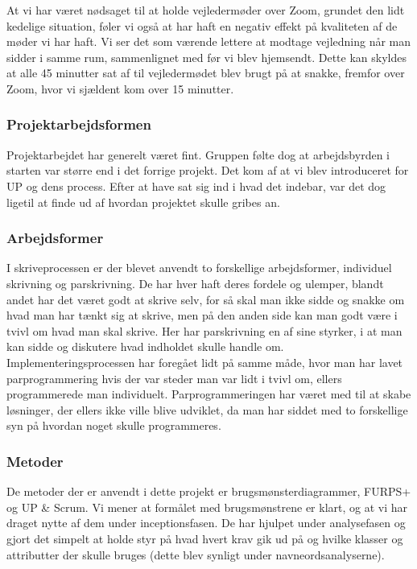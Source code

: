 At vi har været nødsaget til at holde vejledermøder over Zoom, grundet den lidt kedelige situation, føler vi også at har haft en negativ effekt på kvaliteten af de møder vi har haft. Vi ser det som værende lettere at modtage vejledning når man sidder i samme rum, sammenlignet med før vi blev hjemsendt. Dette kan skyldes at alle 45 minutter sat af til vejledermødet blev brugt på at snakke, fremfor over Zoom, hvor vi sjældent kom over 15 minutter.

\subsubsection{Projektarbejdsformen}
Projektarbejdet har generelt været fint. Gruppen følte dog at arbejdsbyrden i starten var større end i det forrige projekt. Det kom af at vi blev introduceret for UP og dens process. Efter at have sat sig ind i hvad det indebar, var det dog ligetil at finde ud af hvordan projektet skulle gribes an. 

\subsubsection{Arbejdsformer}
I skriveprocessen er der blevet anvendt to forskellige arbejdsformer, individuel skrivning og parskrivning.
De har hver haft deres fordele og ulemper, blandt andet har det været godt at skrive selv, for så skal man ikke sidde og snakke om hvad man har tænkt sig at skrive, men på den anden side kan man godt være i tvivl om hvad man skal skrive.
Her har parskrivning en af sine styrker, i at man kan sidde og diskutere hvad indholdet skulle handle om. 
Implementeringsprocessen har foregået lidt på samme måde, hvor man har lavet parprogrammering hvis der var steder man var lidt i tvivl om, ellers programmerede man individuelt.
Parprogrammeringen har været med til at skabe løsninger, der ellers ikke ville blive udviklet, da man har siddet med to forskellige syn på hvordan noget skulle programmeres.

\subsubsection{Metoder}
De metoder der er anvendt i dette projekt er brugsmønsterdiagrammer, FURPS+ og UP \& Scrum.
Vi mener at formålet med brugsmønstrene er klart, og at vi har draget nytte af dem under inceptionsfasen.
De har hjulpet under analysefasen og gjort det simpelt at holde styr på hvad hvert krav gik ud på og hvilke klasser og attributter der skulle bruges (dette blev synligt under navneordsanalyserne). 

